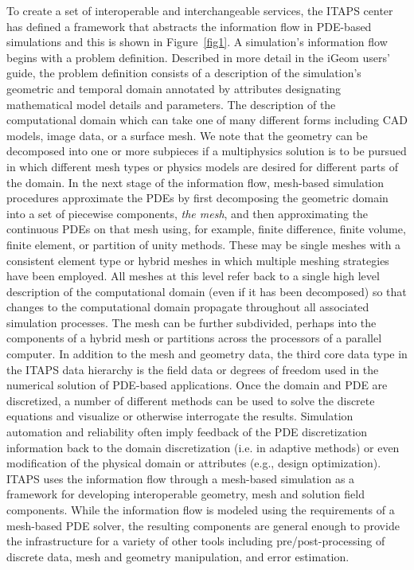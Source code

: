 \documentclass{article}
\begin{document}
To create a set of interoperable and interchangeable services, 
the ITAPS center has defined a framework that abstracts the information 
flow in PDE-based simulations and this is shown in Figure~\ref{fig1}. 
A simulation's information flow 
begins with a problem definition. Described in more detail in 
the iGeom users' guide, the problem definition consists of a 
description of the simulation's geometric and temporal domain 
annotated by attributes designating mathematical model details 
and parameters. The description of the computational domain which 
can take one of many different forms including CAD models, image 
data, or a surface mesh. We note that the geometry can be decomposed 
into one or more subpieces if a multiphysics solution is to be 
pursued in which different mesh types or physics models are desired 
for different parts of the domain. In the next stage of the information 
flow, mesh-based simulation procedures approximate the PDEs by 
first decomposing the geometric domain into a set of piecewise 
components, \textit{the mesh}, and then approximating the continuous 
PDEs on that mesh using, for example, finite difference, finite 
volume, finite element, or partition of unity methods. These 
may be single meshes with a consistent element type or hybrid 
meshes in which multiple meshing strategies have been employed. 
All meshes at this level refer back to a single high level description 
of the computational domain (even if it has been decomposed) 
so that changes to the computational domain propagate throughout 
all associated simulation processes. The mesh can be further 
subdivided, perhaps into the components of a hybrid mesh or partitions 
across the processors of a parallel computer. In addition to 
the mesh and geometry data, the third core data type in the ITAPS 
data hierarchy is the field data or degrees of freedom used in 
the numerical solution of PDE-based applications. Once the domain 
and PDE are discretized, a number of different methods can be 
used to solve the discrete equations and visualize or otherwise 
interrogate the results. Simulation automation and reliability 
often imply feedback of the PDE discretization information back 
to the domain discretization (i.e. in adaptive methods) or even 
modification of the physical domain or attributes (e.g., design 
optimization). ITAPS uses the information flow through a mesh-based 
simulation as a framework for developing interoperable geometry, 
mesh and solution field components. While the information flow 
is modeled using the requirements of a mesh-based PDE solver, 
the resulting components are general enough to provide the infrastructure 
for a variety of other tools including pre/post-processing of 
discrete data, mesh and geometry manipulation, and error estimation.
\end{document}
